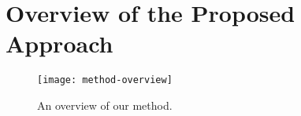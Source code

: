 \section{Overview of the Proposed Approach}
\label{sect:overviewApproach}
{\makeatletter
	\let\par\@@par
	\par{}
	\everypar{}
	\begin{wrapfigure}{r}{9.1cm}
		\begin{center}
			\vspace{-1.6cm}		
			\texttt{[image: method-overview]}
		\end{center}
		\vspace{-0.5cm}	
		\caption{An overview of our method.} %
		\label{fig:method-overview}
	\end{wrapfigure}
%
%
%
}
